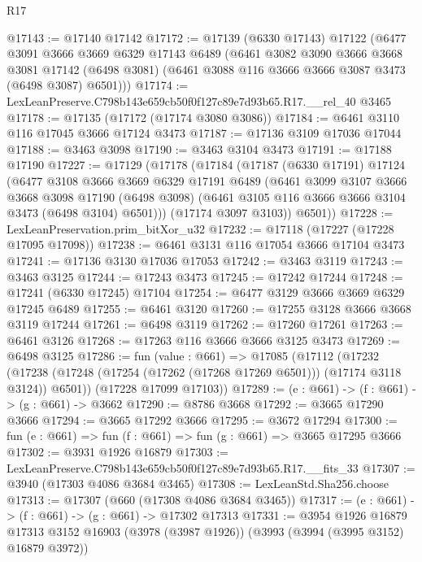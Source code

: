 \begin{lexlean}{R17}
\begin{coremodule}
@17143 := @17140 @17142
@17172 := @17139
    (@6330 @17143)
    @17122
    (@6477
      @3091
      @3666
      @3669
      @6329
      @17143
      @6489
      (@6461
        @3082
        @3090
        @3666
        @3668
        @3081
        @17142
        (@6498 @3081)
        (@6461 @3088 @116 @3666 @3666 @3087 @3473 (@6498 @3087) @6501)))
@17174 := LexLeanPreserve.C798b143e659cb50f0f127c89e7d93b65.R17.__rel_40 @3465
@17178 := @17135 (@17172 (@17174 @3080 @3086))
@17184 := @6461 @3110 @116 @17045 @3666 @17124 @3473
@17187 := @17136 @3109 @17036 @17044
@17188 := @3463 @3098
@17190 := @3463 @3104 @3473
@17191 := @17188 @17190
@17227 := @17129
    (@17178
      (@17184
        (@17187
          (@6330 @17191)
          @17124
          (@6477
            @3108
            @3666
            @3669
            @6329
            @17191
            @6489
            (@6461
              @3099
              @3107
              @3666
              @3668
              @3098
              @17190
              (@6498 @3098)
              (@6461 @3105 @116 @3666 @3666 @3104 @3473 (@6498 @3104) @6501)))
          (@17174 @3097 @3103))
        @6501))
@17228 := LexLeanPreservation.prim_bitXor_u32
@17232 := @17118 (@17227 (@17228 @17095 @17098))
@17238 := @6461 @3131 @116 @17054 @3666 @17104 @3473
@17241 := @17136 @3130 @17036 @17053
@17242 := @3463 @3119
@17243 := @3463 @3125
@17244 := @17243 @3473
@17245 := @17242 @17244
@17248 := @17241 (@6330 @17245) @17104
@17254 := @6477 @3129 @3666 @3669 @6329 @17245 @6489
@17255 := @6461 @3120
@17260 := @17255 @3128 @3666 @3668 @3119 @17244
@17261 := @6498 @3119
@17262 := @17260 @17261
@17263 := @6461 @3126
@17268 := @17263 @116 @3666 @3666 @3125 @3473
@17269 := @6498 @3125
@17286 := fun (value : @661) =>
  @17085
    (@17112
      (@17232 (@17238 (@17248 (@17254 (@17262 (@17268 @17269 @6501))) (@17174 @3118 @3124)) @6501))
      (@17228 @17099 @17103))
@17289 := (e : @661) -> (f : @661) -> (g : @661) -> @3662
@17290 := @8786 @3668
@17292 := @3665 @17290 @3666
@17294 := @3665 @17292 @3666
@17295 := @3672 @17294
@17300 := fun (e : @661) => fun (f : @661) => fun (g : @661) => @3665 @17295 @3666
@17302 := @3931 @1926 @16879
@17303 := LexLeanPreserve.C798b143e659cb50f0f127c89e7d93b65.R17.__fits_33
@17307 := @3940 (@17303 @4086 @3684 @3465)
@17308 := LexLeanStd.Sha256.choose
@17313 := @17307 (@660 (@17308 @4086 @3684 @3465))
@17317 := (e : @661) -> (f : @661) -> (g : @661) -> @17302 @17313
@17331 := @3954
    @1926
    @16879
    @17313
    @3152
    @16903
    (@3978 (@3987 @1926))
    (@3993 (@3994 (@3995 @3152) @16879 @3972))

\end{coremodule}
\end{lexlean}
